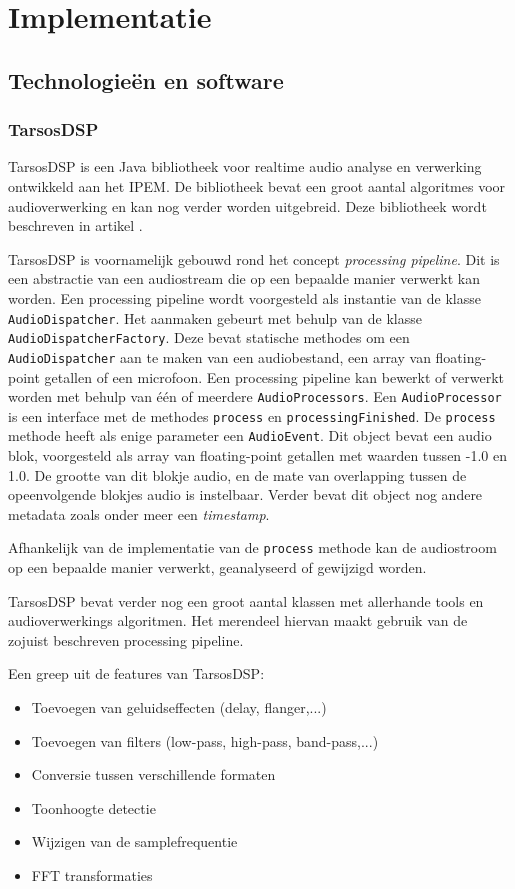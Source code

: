 \chapter{Implementatie}

\section{Technologieën en software}

\subsection{TarsosDSP}

TarsosDSP is een Java bibliotheek voor realtime audio analyse en verwerking ontwikkeld aan het IPEM. De bibliotheek bevat een groot aantal algoritmes voor audioverwerking en kan nog verder worden uitgebreid. Deze bibliotheek wordt beschreven in artikel \cite{six2014tarsosdsp}. 

TarsosDSP is voornamelijk gebouwd rond het concept \textit{processing pipeline}. Dit is een abstractie van een audiostream die op een bepaalde manier verwerkt kan worden.  Een processing pipeline wordt voorgesteld als instantie van de klasse \texttt{AudioDispatcher}. Het aanmaken gebeurt met behulp van de klasse \texttt{AudioDispatcherFactory}. Deze bevat statische methodes om een \texttt{AudioDispatcher} aan te maken van een audiobestand, een array van floating-point getallen of een microfoon. Een processing pipeline kan bewerkt of verwerkt worden met behulp van één of meerdere \texttt{AudioProcessors}. Een \texttt{AudioProcessor} is een interface met de methodes \texttt{process} en \texttt{processingFinished}. De \texttt{process} methode heeft als enige parameter een \texttt{AudioEvent}. Dit object bevat een audio blok, voorgesteld als array van floating-point getallen met waarden tussen -1.0 en 1.0. De grootte van dit blokje audio, en de mate van overlapping tussen de opeenvolgende blokjes audio is instelbaar. Verder bevat dit object nog andere metadata zoals onder meer een \textit{timestamp}.

Afhankelijk van de implementatie van de \texttt{process} methode kan de audiostroom op een bepaalde manier verwerkt, geanalyseerd of gewijzigd worden.

TarsosDSP bevat verder nog een groot aantal klassen met allerhande tools en audioverwerkings algoritmen. Het merendeel hiervan maakt gebruik van de zojuist beschreven processing pipeline. 

Een greep uit de features van TarsosDSP:
\begin{itemize}[noitemsep]
	\item Toevoegen van geluidseffecten (delay, flanger,...)
	\item Toevoegen van filters (low-pass, high-pass, band-pass,...)
	\item Conversie tussen verschillende formaten
	\item Toonhoogte detectie
	\item Wijzigen van de samplefrequentie
	\item FFT transformaties
\end{itemize}

